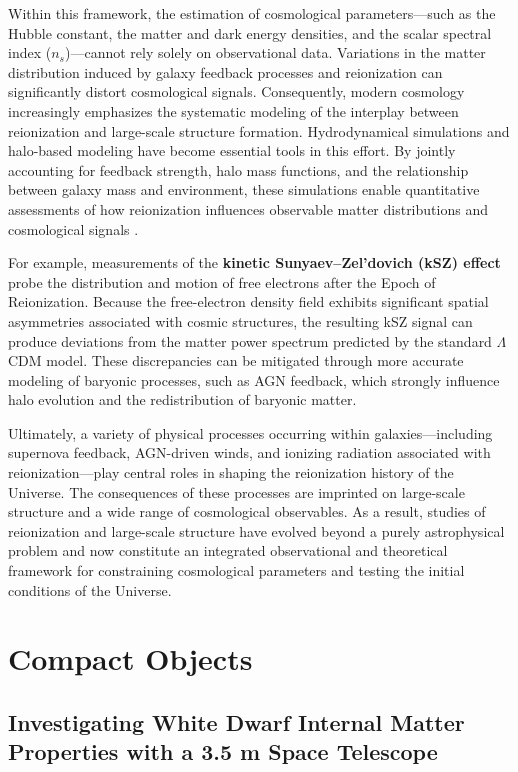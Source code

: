 Within this framework, the estimation of cosmological parameters---such as the Hubble constant, the matter and dark energy densities, and the scalar spectral index ($n_s$)---cannot rely solely on observational data. Variations in the matter distribution induced by galaxy feedback processes and reionization can significantly distort cosmological signals. Consequently, modern cosmology increasingly emphasizes the systematic modeling of the interplay between reionization and large-scale structure formation. Hydrodynamical simulations and halo-based modeling have become essential tools in this effort. By jointly accounting for feedback strength, halo mass functions, and the relationship between galaxy mass and environment, these simulations enable quantitative assessments of how reionization influences observable matter distributions and cosmological signals \cite{smith2022}.

For example, measurements of the \textbf{kinetic Sunyaev--Zel'dovich (kSZ) effect} probe the distribution and motion of free electrons after the Epoch of Reionization. Because the free-electron density field exhibits significant spatial asymmetries associated with cosmic structures, the resulting kSZ signal can produce deviations from the matter power spectrum predicted by the standard $\Lambda$CDM model. These discrepancies can be mitigated through more accurate modeling of baryonic processes, such as AGN feedback, which strongly influence halo evolution and the redistribution of baryonic matter.

Ultimately, a variety of physical processes occurring within galaxies---including supernova feedback, AGN-driven winds, and ionizing radiation associated with reionization---play central roles in shaping the reionization history of the Universe. The consequences of these processes are imprinted on large-scale structure and a wide range of cosmological observables. As a result, studies of reionization and large-scale structure have evolved beyond a purely astrophysical problem and now constitute an integrated observational and theoretical framework for constraining cosmological parameters and testing the initial conditions of the Universe.

\section{Compact Objects}

\subsection{Investigating White Dwarf Internal Matter Properties with a 3.5 m Space Telescope}


